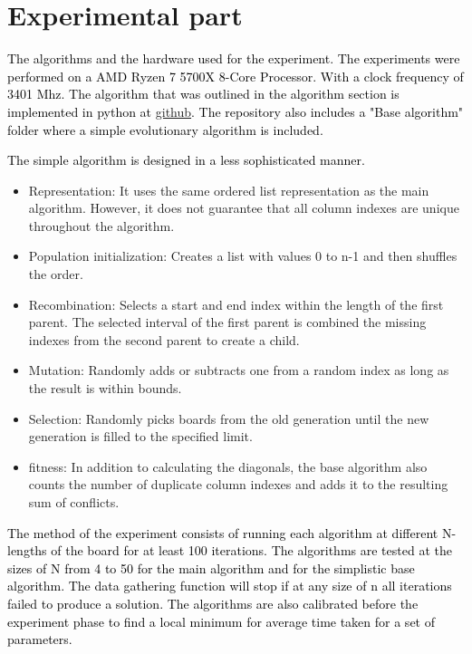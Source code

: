 \documentclass{scrartcl}
\begin{document}
\section{Experimental part}
\label{sec:experimentation}

\textcolor{black}{The algorithms and the hardware used for the experiment. The experiments were performed on a AMD Ryzen 7 5700X 8-Core Processor. With a clock frequency of 3401 Mhz. The algorithm that was outlined in the algorithm section is implemented in python at \href{https://github.com/Sneakycloud/N-queens\_problem\_Evolutionary\_Alg/tree/main}{github}. The repository also includes a "Base algorithm" folder where a simple evolutionary algorithm is included.}

\textcolor{black}{The simple algorithm is designed in a less sophisticated manner.}
\begin{itemize}
	\item Representation: It uses the same ordered list representation as the main algorithm. However, it does not guarantee that all column indexes are unique throughout the algorithm.
	\item Population initialization:  Creates a list with values 0 to n-1 and then shuffles the order.
	\item Recombination: Selects a start and end index within the length of the first parent. The selected interval of the first parent is combined the missing indexes from the second parent to create a child.
	\item Mutation: Randomly adds or subtracts one from a random index as long as the result is within bounds.
	\item Selection: Randomly picks boards from the old generation until the new generation is filled to the specified limit.
	\item fitness: In addition to calculating the diagonals, the base algorithm also counts the number of duplicate column indexes and adds it to the resulting sum of conflicts. 
\end{itemize}

\textcolor{black}{The method of the experiment consists of running each algorithm at different N-lengths of the board for at least 100 iterations. The algorithms are tested at the sizes of N from 4 to 50 for the main algorithm and for the simplistic base algorithm. The data gathering function will stop if at any size of n all iterations failed to produce a solution. The algorithms are also calibrated before the experiment phase to find a local minimum for average time taken for a set of parameters.}
\end{document}
